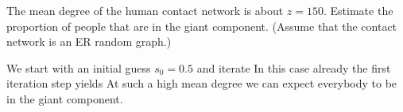 The mean degree of the human contact network is about $z=150$. Estimate the proportion of people that are in the giant component.
(Assume that the contact network is an ER random graph.)

\solution
We start with an initial guess $s_0=0.5$ and iterate 
In this case already the first iteration step yields
At such a high mean degree we can expect everybody to be in the giant component. 
